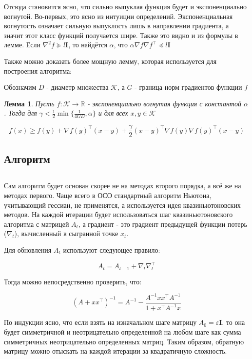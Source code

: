 \documentclass[12pt]{article}
\newtheorem*{lemma}{Лемма}
\theoremstyle{definition}
\begin{document}
Отсюда становится ясно, что сильно выпуклая функция будет и экспоненциально вогнутой. Во-первых, это ясно из интуиции определений. Экспоненциальная вогнутость означает сильную выпуклость лишь в направлении градиента, а значит этот класс функций получается шире. Также это видно и из формулы в лемме. Если $\nabla^2 f \succcurlyeq l\mathbf{I}$, то найдётся $\alpha$, что $\alpha \nabla f \nabla f^\top \preccurlyeq l\mathbf{I}$

Также можно доказать более мощную лемму, которая используется для построения алгоритма:

Обозначим $D$ - диаметр множества $\mathcal{K}$, а $G$ - граница норм градиентов функции $f$

\begin{lemma}
Пусть $f: \mathcal{K} \rightarrow \mathbb{R}$ - экспоненциально вогнутая функция с константой $\alpha$. Тогда для $\gamma < \frac{1}{2} \min\{\frac{1}{4GD}, \alpha\}$ и для всех $x, y \in \mathcal{K}$

$$ f(x) \geqslant f(y) + \nabla f(y)^\top (x - y) + \frac{\gamma}{2} (x - y)^\top \nabla f(y) \nabla f(y)^\top (x - y) $$
\end{lemma}

\subsection{Алгоритм}
$ $

Сам алгоритм будет основан скорее не на методах второго порядка, а всё же на методах первого. Чаще всего в ОСО стандартный алгоритм Ньютона, учитывающий гессиан, не применятся, а используется идея квазиньютоновских методов. На каждой итерации будет использоваться шаг квазиньютоновского алгоритма с матрицей $A_t$, а градиент - это градиент предыдущей функции потерь ($\nabla_t$), вычисленный в сыгранной точке $x_t$.

Для обновления $A_t$ используют следующее правило:

$$ A_t = A_{t - 1} + \nabla_t \nabla_t^\top $$

Тогда можно непосредственно проверить, что:

$$ (A + xx^\top)^{-1} = A^{-1} - \frac{A^{-1}xx^\top A^{-1}}{1 + x^\top A^{-1} x} $$

По индукции ясно, что если взять на изначальном шаге матрицу $A_0 = \varepsilon \mathbf{I}$, то она будет симметричной и неотрицательно определенной на любом шаге как сумма симметричных неотрицательно определенных матриц. Таким образом, обратную матрицу можно отыскать на каждой итерации за квадратичную сложность.
\end{document}
